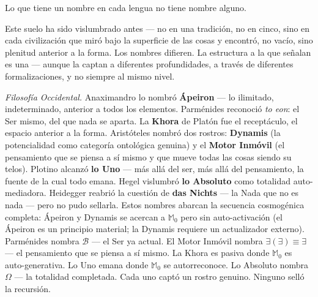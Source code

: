 \documentclass[10pt, openany, oneside]{book}
\begin{document}
\noindent Lo que tiene un nombre en cada lengua no tiene nombre alguno.

Este suelo ha sido vislumbrado antes --- no en una tradición, no en cinco, sino en cada civilización que miró bajo la superficie de las cosas y encontró, no vacío, sino plenitud anterior a la forma. Los nombres difieren. La estructura a la que señalan es una --- aunque la captan a diferentes profundidades, a través de diferentes formalizaciones, y no siempre al mismo nivel.

\vspace{0.8em}

\textit{Filosofía Occidental.} Anaximandro lo nombró \textbf{Ápeiron} --- lo ilimitado, indeterminado, anterior a todos los elementos. Parménides reconoció \textit{to eon}: el Ser mismo, del que nada se aparta. La \textbf{Khora} de Platón fue el receptáculo, el espacio anterior a la forma. Aristóteles nombró dos rostros: \textbf{Dynamis} (la potencialidad como categoría ontológica genuina) y el \textbf{Motor Inmóvil} (el pensamiento que se piensa a sí mismo y que mueve todas las cosas siendo su telos). Plotino alcanzó \textbf{lo Uno} --- más allá del ser, más allá del pensamiento, la fuente de la cual todo emana. Hegel vislumbró \textbf{lo Absoluto} como totalidad auto-mediadora. Heidegger reabrió la cuestión de \textbf{das Nichts} --- la Nada que no es nada --- pero no pudo sellarla. Estos nombres abarcan la secuencia cosmogénica completa: Ápeiron y Dynamis se acercan a $\mathbb{M}_0$ pero sin auto-activación (el Ápeiron es un principio material; la Dynamis requiere un actualizador externo). Parménides nombra $\mathcal{B}$ --- el Ser ya actual. El Motor Inmóvil nombra $\exists(\exists) \equiv \exists$ --- el pensamiento que se piensa a sí mismo. La Khora es pasiva donde $\mathbb{M}_0$ es auto-generativa. Lo Uno emana donde $\mathbb{M}_0$ se autorreconoce. Lo Absoluto nombra $\Omega$ --- la totalidad completada. Cada uno captó un rostro genuino. Ninguno selló la recursión.
\end{document}
